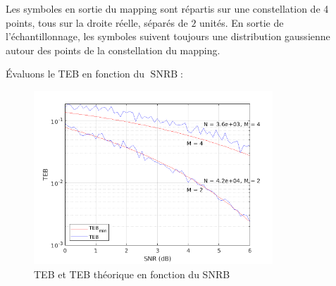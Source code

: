 \documentclass[a4paper, 12pt]{article}
\begin{document}
\vspace*{-1cm}
\begin{figure}[H]
\begin{adjustbox}{center}
\hspace{1em}
\end{adjustbox}
\end{figure}

Les symboles en sortie du mapping sont répartis sur une constellation de 4
points, tous sur la droite réelle, séparés de $2$ unités. En sortie de
l'échantillonnage, les symboles suivent toujours une distribution gaussienne
autour des points de la constellation du mapping. \medbreak

\clearpage
Évaluons le TEB en fonction du $\operatorname{SNRB}$:

\begin{figure}[H]
    \centering
    \includegraphics[width=0.8\textwidth]{graphics/3-2.png}
    \caption{TEB et TEB théorique en fonction du SNRB}
    \label{fig:teb_snrb_ask}
\end{figure}
\end{document}
